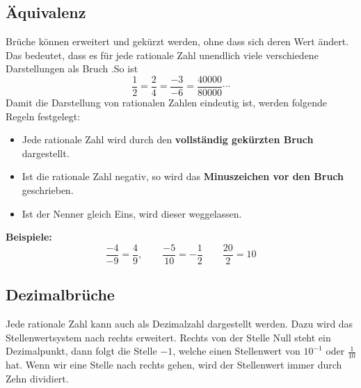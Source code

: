 \subsection{Äquivalenz}

Brüche können erweitert und gekürzt werden, ohne dass sich deren Wert ändert. Das bedeutet, dass es für jede rationale Zahl unendlich viele verschiedene Darstellungen als Bruch .So ist
\[
  \frac{1}{2} = \frac{2}{4} = \frac{-3}{-6} = \frac{40000}{80000} \cdots
\]
Damit die Darstellung von rationalen Zahlen eindeutig ist, werden folgende Regeln festgelegt:
\begin{itemize}[noitemsep]
  \item Jede rationale Zahl wird durch den \textbf{vollständig gekürzten Bruch} dargestellt.
  \item Ist die rationale Zahl negativ, so wird das \textbf{Minuszeichen vor den Bruch} geschrieben.
  \item Ist der Nenner gleich Eins, wird dieser weggelassen.
\end{itemize}
\begin{example}
  \textbf{Beispiele:}
  \[
    \frac{-4}{-9} = \frac{4}{9}, \qquad \frac{-5}{10} = -\frac{1}{2} \qquad \frac{20}{2} = 10
  \]
\end{example}

\subsection{Dezimalbrüche}

Jede rationale Zahl kann auch als Dezimalzahl dargestellt werden. Dazu wird das Stellenwertsystem nach rechts erweitert. Rechts von der Stelle Null steht ein Dezimalpunkt, dann folgt die Stelle $-1$, welche einen Stellenwert von $10^{-1}$ oder $\frac{1}{10}$ hat. Wenn wir eine Stelle nach rechts gehen, wird der Stellenwert immer durch Zehn dividiert.

